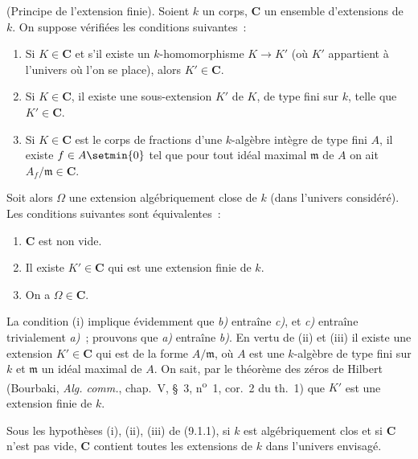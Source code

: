 \begin{proposition}[9.1.1]
\label{IV.9.1.1-fr}
\textnormal{(Principe de l'extension finie).} Soient $k$ un corps,
$\boldsymbol{C}$ un ensemble d'extensions de $k$. On suppose vérifiées les
conditions suivantes~:
\begin{enumerate}[label=\textup{(\roman*)}]
  \item Si $K\in\boldsymbol{C}$ et s'il existe un $k$-homomorphisme $K\to K'$
  (où $K'$ appartient à l'univers où l'on se place), alors
  $K'\in\boldsymbol{C}$.
  \item Si $K\in\boldsymbol{C}$, il existe une sous-extension $K'$ de $K$, de
  type fini sur $k$, telle que $K'\in\boldsymbol{C}$.
  \item Si $K\in\boldsymbol{C}$ est le corps de fractions d'une $k$-algèbre
  intègre de type fini $A$, il existe $f\in A\setmin\{0\}$ tel que pour tout idéal
  maximal $\mathfrak m$ de $A$ on ait $A_f/\mathfrak m\in\boldsymbol{C}$.
\end{enumerate}

Soit alors $\Omega$ une extension algébriquement close de $k$ (dans l'univers
considéré). Les conditions suivantes sont équivalentes~:
\begin{enumerate}[label=\emph{\alph*)}]
  \item $\boldsymbol{C}$ est non vide.
  \item Il existe $K'\in\boldsymbol{C}$ qui est une extension \textup{finie} de $k$.
  \item On a $\Omega\in\boldsymbol{C}$.
\end{enumerate}
\end{proposition}

La condition (i) implique évidemment que \emph{b)} entraîne \emph{c)}, et
\emph{c)} entraîne trivialement \emph{a)}~; prouvons que \emph{a)} entraîne
\emph{b)}. En vertu de (ii) et (iii) il existe une extension
$K'\in\boldsymbol{C}$ qui est de la forme $A/\mathfrak m$, où $A$ est une
$k$-algèbre de type fini sur $k$ et $\mathfrak m$ un idéal maximal de $A$.
On sait, par le théorème des zéros de Hilbert (Bourbaki, \emph{Alg. comm.},
chap.~V, \S~3, n\textsuperscript{o}~1, cor.~2 du th.~1) que $K'$ est une
extension finie de $k$.

\begin{corollary}[9.1.2]
\label{IV.9.1.2-fr}
Sous les hypothèses \textup{(i), (ii), (iii)} de \textup{(9.1.1)}, si $k$ est algébriquement
clos et si $\boldsymbol{C}$ n'est pas vide, $\boldsymbol{C}$ contient toutes les
extensions de $k$ dans l'univers envisagé.
\end{corollary}

